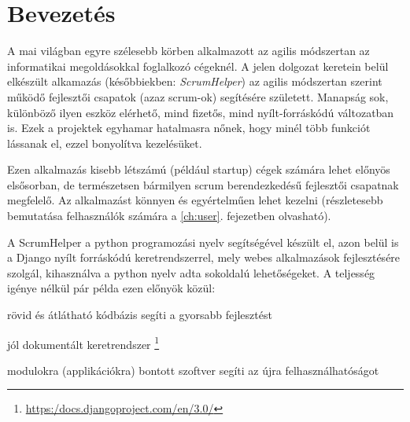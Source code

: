 \chapter{Bevezetés} %
\label{ch:intro}

A mai világban egyre szélesebb körben alkalmazott az agilis módszertan az informatikai megoldásokkal foglalkozó cégeknél. A jelen dolgozat keretein belül elkészült alkamazás (későbbiekben: \textit{ScrumHelper}) az agilis módszertan szerint működő fejlesztői csapatok (azaz scrum-ok) segítésére született. Manapság sok, különböző ilyen eszköz elérhető, mind fizetős, mind nyílt-forráskódú változatban is. Ezek a projektek egyhamar hatalmasra nőnek, hogy minél több funkciót lássanak el, ezzel bonyolítva kezelésüket.

Ezen alkalmazás kisebb létszámú (például startup) cégek számára lehet előnyös elsősorban, de természetsen bármilyen scrum berendezkedésű fejlesztői csapatnak megfelelő. Az alkalmazást könnyen és egyértelműen lehet kezelni (részletesebb bemutatása felhasználók számára a \ref{ch:user}. fejezetben olvasható). 

A ScrumHelper a python programozási nyelv segítségével készült el, azon belül is a Django nyílt forráskódú keretrendszerrel, mely webes alkalmazások fejlesztésére szolgál, kihasználva a python nyelv adta  sokoldalú lehetőségeket. A teljesség igénye nélkül pár példa ezen előnyök közül: 
\begin{compactitem}
	\item rövid és átlátható kódbázis segíti a gyorsabb fejlesztést
	\item jól dokumentált keretrendszer \footnote{\url{https:/docs.djangoproject.com/en/3.0/}}
	\item modulokra (applikációkra) bontott szoftver segíti az újra felhasználhatóságot
\end{compactitem}

